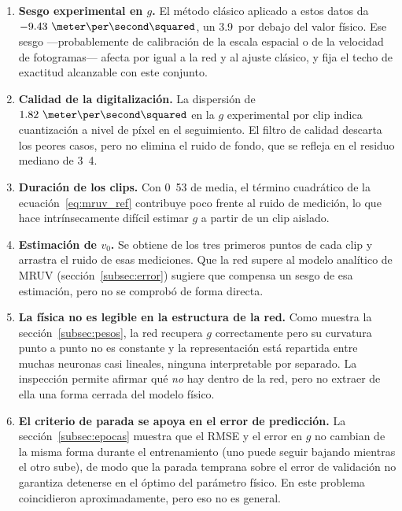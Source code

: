 \documentclass[titlepage,11pt]{article}
\providecommand{\num}[1]{\ensuremath{#1}}
\providecommand{\SI}[2]{#1\,#2}
\providecommand{\percent}{\char37\relax}
\begin{document}
\begin{enumerate}
\item \textbf{Sesgo experimental en $g$.} El método clásico aplicado a estos
  datos da $\num{-9.43}~\meter\per\second\squared$, un \SI{3.9}{\percent} por
  debajo del valor físico. Ese sesgo ---probablemente de calibración de la
  escala espacial o de la velocidad de fotogramas--- afecta por igual a la red
  y al ajuste clásico, y fija el techo de exactitud alcanzable con este
  conjunto.

\item \textbf{Calidad de la digitalización.} La dispersión de
  $\num{1.82}~\meter\per\second\squared$ en la $g$ experimental por clip indica
  cuantización a nivel de píxel en el seguimiento. El filtro de calidad
  descarta los peores casos, pero no elimina el ruido de fondo, que se refleja
  en el residuo mediano de \unit{3.4}{\centi\meter}.

\item \textbf{Duración de los clips.} Con \unit{0.53}{\second} de media, el
  término cuadrático de la ecuación~\eqref{eq:mruv_ref} contribuye poco frente
  al ruido de medición, lo que hace intrínsecamente difícil estimar $g$ a
  partir de un clip aislado.

\item \textbf{Estimación de $v_0$.} Se obtiene de los tres primeros puntos de
  cada clip y arrastra el ruido de esas mediciones. Que la red supere al modelo
  analítico de MRUV (sección~\ref{subsec:error}) sugiere que compensa un sesgo
  de esa estimación, pero no se comprobó de forma directa.

\item \textbf{La física no es legible en la estructura de la red.} Como muestra
  la sección~\ref{subsec:pesos}, la red recupera $g$ correctamente pero su
  curvatura punto a punto no es constante y la representación está repartida
  entre muchas neuronas casi lineales, ninguna interpretable por separado. La
  inspección permite afirmar qué \emph{no} hay dentro de la red, pero no
  extraer de ella una forma cerrada del modelo físico.

\item \textbf{El criterio de parada se apoya en el error de predicción.} La
  sección~\ref{subsec:epocas} muestra que el RMSE y el error en $g$ no cambian de la misma forma durante el entrenamiento (uno puede seguir
  bajando mientras el otro sube), de modo que la parada temprana sobre el error de
  validación no garantiza detenerse en el óptimo del parámetro físico. En este
  problema coincidieron aproximadamente, pero eso no es general.
\end{enumerate}
\end{document}
